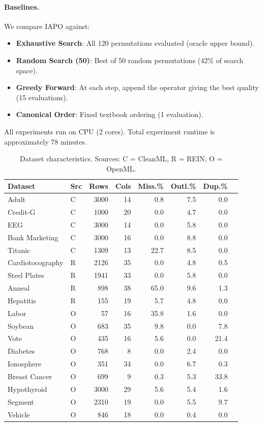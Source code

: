 \documentclass[preprint]{article}
\begin{document}
\paragraph{Baselines.} We compare IAPO against:
\begin{itemize}[nosep]
\item \textbf{Exhaustive Search}: All 120 permutations evaluated (oracle upper bound).
\item \textbf{Random Search (50)}: Best of 50 random permutations (42\% of search space).
\item \textbf{Greedy Forward}: At each step, append the operator giving the best quality (15 evaluations).
\item \textbf{Canonical Order}: Fixed textbook ordering (1 evaluation).
\end{itemize}

All experiments run on CPU (2 cores). Total experiment runtime is approximately 78 minutes.

\begin{table}[t]
\caption{Dataset characteristics. Sources: C = CleanML, R = REIN, O = OpenML.}
\label{tab:datasets}
\centering
\small
\begin{tabular}{llrrrrrr}
\toprule
Dataset & Src & Rows & Cols & Miss.\% & Outl.\% & Dup.\% \\
\midrule
Adult         & C & 3000 & 14 & 0.8  & 7.5  & 0.0  \\
Credit-G      & C & 1000 & 20 & 0.0  & 4.7  & 0.0  \\
EEG           & C & 3000 & 14 & 0.0  & 5.8  & 0.0  \\
Bank Marketing& C & 3000 & 16 & 0.0  & 8.8  & 0.0  \\
Titanic       & C & 1309 & 13 & 22.7 & 8.5  & 0.0  \\
\midrule
Cardiotocography & R & 2126 & 35 & 0.0 & 4.8 & 0.5  \\
Steel Plates  & R & 1941 & 33 & 0.0  & 5.8  & 0.0  \\
Anneal        & R & 898  & 38 & 65.0 & 9.6  & 1.3  \\
Hepatitis     & R & 155  & 19 & 5.7  & 4.8  & 0.0  \\
\midrule
Labor         & O & 57   & 16 & 35.8 & 1.6  & 0.0  \\
Soybean       & O & 683  & 35 & 9.8  & 0.0  & 7.8  \\
Vote          & O & 435  & 16 & 5.6  & 0.0  & 21.4 \\
Diabetes      & O & 768  & 8  & 0.0  & 2.4  & 0.0  \\
Ionosphere    & O & 351  & 34 & 0.0  & 6.7  & 0.3  \\
Breast Cancer & O & 699  & 9  & 0.3  & 5.3  & 33.8 \\
Hypothyroid   & O & 3000 & 29 & 5.6  & 5.4  & 1.6  \\
Segment       & O & 2310 & 19 & 0.0  & 5.5  & 9.7  \\
Vehicle       & O & 846  & 18 & 0.0  & 0.4  & 0.0  \\
\bottomrule
\end{tabular}
\end{table}
\end{document}
